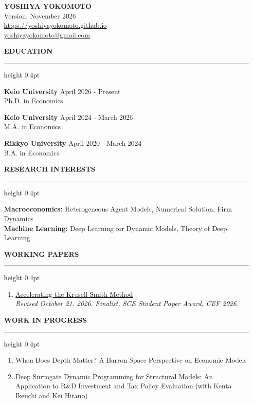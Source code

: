 \documentclass[11pt,letterpaper]{article}
\newenvironment{rSection}[1]{%
  \par\addvspace{9pt}%
  {\bfseries\MakeUppercase{#1}}\par\nobreak
  \vspace{2pt}\hrule height 0.4pt\nobreak\vspace{4pt}%
  \begin{list}{}{%
    \setlength{\leftmargin}{1.5em}%
    \setlength{\rightmargin}{0pt}%
    \setlength{\topsep}{0pt}%
    \setlength{\partopsep}{0pt}%
    \setlength{\parsep}{3pt}%
  }\item[]%
}{\end{list}}
\begin{document}
\begin{center}
  {\LARGE\bfseries YOSHIYA YOKOMOTO}\\[6pt]
  Version: November 2026\\
  \href{https://yoshiyayokomoto.github.io}{https://yoshiyayokomoto.github.io}\\
  \href{mailto:yoshiyayokomoto@gmail.com}{yoshiyayokomoto@gmail.com}
\end{center}
\vspace{-5pt}

\begin{rSection}{Education}
\textbf{Keio University} \hfill April 2026 - Present\\
Ph.D. in Economics

\textbf{Keio University} \hfill April 2024 - March 2026\\
M.A. in Economics

\textbf{Rikkyo University} \hfill April 2020 - March 2024\\
B.A. in Economics
\end{rSection}

\begin{rSection}{Research Interests}
\textbf{Macroeconomics:} Heterogeneous Agent Models, Numerical Solution, Firm Dynamics\\
\textbf{Machine Learning:} Deep Learning for Dynamic Models, Theory of Deep Learning
\end{rSection}

\begin{rSection}{Working Papers}
\begin{enumerate}
  \item \href{https://yoshiyayokomoto.github.io/files/Acc_KS-main.pdf}{Accelerating the Krusell-Smith Method}\\
  {\small\emph{Revised October 21, 2026. Finalist, SCE Student Paper Award, CEF 2026.}}
\end{enumerate}
\end{rSection}

\begin{rSection}{Work in Progress}
\begin{enumerate}
  \item When Does Depth Matter? A Barron Space Perspective on Economic Models
  \item Deep Surrogate Dynamic Programming for Structural Models: An Application to R\&D Investment and Tax Policy Evaluation (with Kenta Ikeuchi and Kei Hirano)
\end{enumerate}
\end{rSection}
\end{document}
